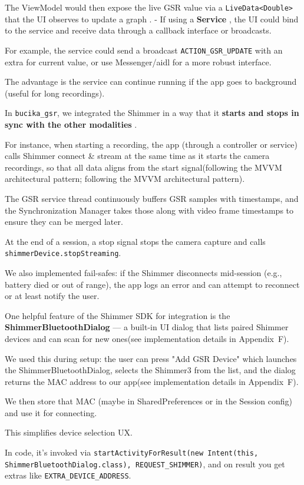 {{The ViewModel would then expose the live GSR value via a \texttt{LiveData<Double>} that the UI observes to update a graph
. - If using a \textbf{Service}
, the UI could bind to the service and receive data through a callback interface
or broadcasts.

For example, the service could send a broadcast \texttt{ACTION_GSR_UPDATE} with
an extra for current value, or use Messenger/aidl for a more robust interface.

The advantage is the service can continue running if the app goes to background
(useful for long recordings).

In \texttt{bucika_gsr}, we integrated the Shimmer in a way that it \textbf{starts and stops in sync with the other modalities}
.

For instance, when starting a recording, the app (through a controller or
service) calls Shimmer connect & stream at the same time as it starts the camera
recordings, so that all data aligns from the start signal(following the MVVM
architectural pattern; following the MVVM architectural pattern).

The GSR service thread continuously buffers GSR samples with timestamps, and the
Synchronization Manager takes those along with video frame timestamps to ensure
they can be merged later.

At the end of a session, a stop signal stops the camera capture and calls
\texttt{shimmerDevice.stopStreaming}.

We also implemented fail-safes: if the Shimmer disconnects mid-session (e.g.,
battery died or out of range), the app logs an error and can attempt to
reconnect or at least notify the user.

One helpful feature of the Shimmer SDK for integration is the \textbf{ShimmerBluetoothDialog}
--- a built-in UI dialog that lists paired Shimmer devices and can scan for new
ones(see implementation details in Appendix~F).

We used this during setup: the user can press "Add GSR Device" which launches
the ShimmerBluetoothDialog, selects the Shimmer3 from the list, and the dialog
returns the MAC address to our app(see implementation details in Appendix~F).

We then store that MAC (maybe in SharedPreferences or in the Session config) and
use it for connecting.

This simplifies device selection UX.

In code, it's invoked via \texttt{startActivityForResult(new Intent(this,
ShimmerBluetoothDialog.class), REQUEST_SHIMMER)}, and on result you get extras
like \texttt{EXTRA_DEVICE_ADDRESS}.

}}
